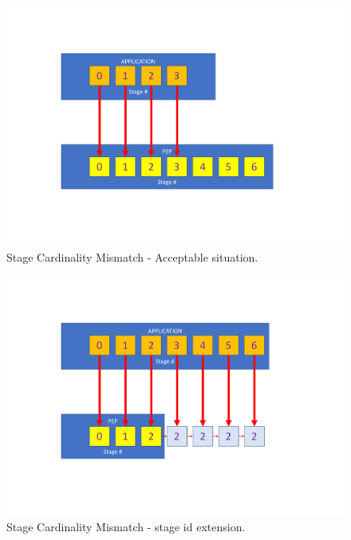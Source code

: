 \begin{figure}[t]
	\vspace{-1.5cm}
	\centering
	\includegraphics[width=\columnwidth]{images/stage_cardinality_mismatch_ok.pdf}
	\vspace{-2.5cm}
	\caption{Stage Cardinality Mismatch - Acceptable situation.}
	\label{fig:stage_cardinality_mismatch_ok}
\end{figure}
\begin{figure}[tbhp]
	\vspace{-1cm}
	\centering
	\includegraphics[width=\columnwidth]{images/stage_id_extension.pdf}
	\vspace{-2.5cm}
	\caption{Stage Cardinality Mismatch - stage id extension.}
	\label{fig:stage_id_extension}
\end{figure}

